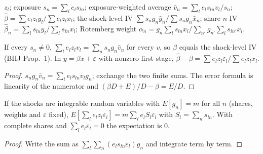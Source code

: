 \begin{definition}
\label{def:shift-share}
\leanok
$z_l$; exposure $s_n = \sum_le_ls_{ln}$; exposure-weighted average $\bar v_n = \sum_le_ls_{ln}v_l/s_n$;
$\hat\beta = \sum e_lz_ly_l/\sum e_lz_lx_l$; the shock-level IV $\sum s_ng_n\bar y_n/\sum s_ng_n\bar x_n$; share-$n$ IV
$\hat\beta_n = \sum_ls_{ln}y_l/\sum_ls_{ln}x_l$; Rotemberg weight
$\alpha_n = g_n\sum_ls_{ln}x_l/\sum_{n'}g_{n'}\sum_ls_{ln'}x_l$.
\end{definition}

\begin{theorem}
\label{thm:bhj}
\leanok
{}
If every $s_n\neq0$, $\sum_le_lz_lv_l = \sum_ns_ng_n\bar v_n$ for every $v$, so $\hat\beta$ equals the shock-level IV
(BHJ Prop.~1). In $y = \beta x + \varepsilon$ with nonzero first stage, $\hat\beta - \beta = \sum e_lz_l\varepsilon_l /
\sum e_lz_lx_l$.
\end{theorem}
\begin{proof}
\leanok
$s_ng_n\bar v_n = \sum_le_ls_{ln}v_lg_n$; exchange the two finite sums. The error formula is linearity of the numerator
and $(\beta D + E)/D - \beta = E/D$.
\end{proof}

\begin{theorem}
\label{thm:bhj-ident}
\leanok
{}
If the shocks are integrable random variables with $E[g_n] = m$ for all $n$ (shares, weights and $\varepsilon$ fixed),
$E[\sum_le_lz_l\varepsilon_l] = m\sum_le_lS_l\varepsilon_l$ with $S_l = \sum_ns_{ln}$. With complete shares and
$\sum_le_l\varepsilon_l = 0$ the expectation is $0$.
\end{theorem}
\begin{proof}
\leanok
Write the sum as $\sum_l\sum_n(e_ls_{ln}\varepsilon_l)g_n$ and integrate term by term.
\end{proof}

